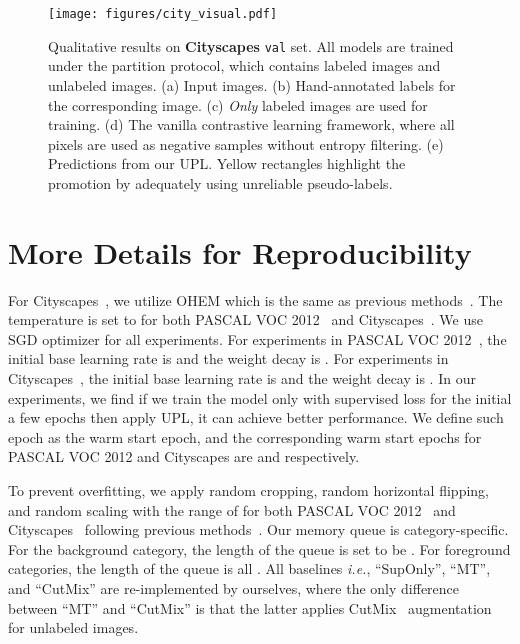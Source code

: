 \documentclass[10pt, twocolumn, letterpaper]{article}
\begin{document}
\begin{figure*}[t]
    \centering
    \texttt{[image: figures/city\_visual.pdf]}
    \vspace{-18pt}
    \caption{
    Qualitative results on \textbf{Cityscapes} \texttt{val} set.
All models are trained under the  partition protocol, which contains  labeled images and  unlabeled images.
(a) Input images. 
(b) Hand-annotated labels for the corresponding image. 
(c) \textit{Only} labeled images are used for training.
(d) The vanilla contrastive learning framework, where all pixels are used as negative samples without entropy filtering.
(e) Predictions from our UPL.
Yellow rectangles highlight the promotion by adequately using unreliable pseudo-labels.
    }
    \label{fig:visual_city}
    \vspace{-10pt}
\end{figure*}


\section{More Details for Reproducibility}\label{sec:reproduce}


For Cityscapes~\cite{cityscapes}, we utilize OHEM which is the same as previous methods~\cite{cps, ael}.
The temperature  is set to  for both PASCAL VOC 2012~\cite{voc} and Cityscapes~\cite{cityscapes}.
We use SGD optimizer for all experiments.
For experiments in PASCAL VOC 2012~\cite{voc}, the initial base learning rate is  and the weight decay is .
For experiments in Cityscapes~\cite{cityscapes}, the initial base learning rate is  and the weight decay is .
In our experiments, we find if we train the model only with supervised loss for the initial a few epochs then apply UPL, it can achieve better performance.
We define such epoch as the warm start epoch, and the corresponding warm start epochs for PASCAL VOC 2012 and Cityscapes are  and  respectively.


To prevent overfitting, we apply random cropping, random horizontal flipping, and random scaling with the range of  for both PASCAL VOC 2012~\cite{voc} and Cityscapes~\cite{cityscapes} following previous methods~\cite{ael,cps,pc2seg,pseudoseg}.
Our memory queue is category-specific. 
For the background category, the length of the queue is set to be .
For foreground categories, the length of the queue is all .
All baselines \textit{i.e.}, ``SupOnly'', ``MT'', and ``CutMix'' are re-implemented by ourselves,
where the only difference between ``MT'' and ``CutMix'' is that the latter applies CutMix~\cite{cutmix} augmentation for unlabeled images.
\end{document}
